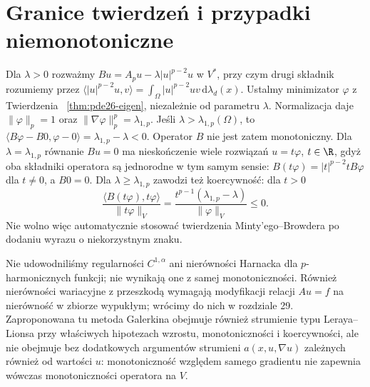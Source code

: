 \section{Granice twierdzeń i przypadki niemonotoniczne}
\begin{kontrprzyklad}
\label{ex:pde26-nonmonotone}
Dla $\lambda>0$ rozważmy
$Bu=A_pu-\lambda|u|^{p-2}u$ w $V^*$,
przy czym drugi składnik rozumiemy przez
$\langle |u|^{p-2}u,v\rangle=
\int_\Omega|u|^{p-2}uv\,\mathrm d\lambda_d(x)$.
Ustalmy minimizator $\varphi$ z Twierdzenia
~\ref{thm:pde26-eigen}, niezależnie od parametru $\lambda$.
Normalizacja daje $\|\varphi\|_p=1$ oraz
$\|\nabla\varphi\|_p^p=\lambda_{1,p}$.
Jeśli $\lambda>\lambda_{1,p}(\Omega)$, to
$\langle B\varphi-B0,\varphi-0\rangle
=\lambda_{1,p}-\lambda<0$.
Operator $B$ nie jest zatem monotoniczny.
Dla $\lambda=\lambda_{1,p}$ równanie $Bu=0$ ma
nieskończenie wiele rozwiązań $u=t\varphi$, $t\in\R$,
gdyż oba składniki operatora są jednorodne
w tym samym sensie: $B(t\varphi)=|t|^{p-2}tB\varphi$
dla $t\ne0$, a $B0=0$.
Dla $\lambda\ge\lambda_{1,p}$ zawodzi też koercywność:
dla $t>0$
\[
 \frac{\langle B(t\varphi),t\varphi\rangle}
      {\|t\varphi\|_V}
 =\frac{t^{p-1}(\lambda_{1,p}-\lambda)}{\|\varphi\|_V}
 \le0.
\]
Nie wolno więc automatycznie stosować twierdzenia
Minty'ego--Browdera po dodaniu wyrazu o niekorzystnym znaku.
\end{kontrprzyklad}

\begin{uwaga}
Nie udowodniliśmy regularności $C^{1,\alpha}$
ani nierówności Harnacka dla $p$-harmonicznych funkcji;
nie wynikają one z samej monotoniczności. Również
nierówności wariacyjne z przeszkodą wymagają
modyfikacji relacji $Au=f$ na nierówność w zbiorze wypukłym;
wrócimy do nich w rozdziale 29.
Zaproponowana tu metoda Galerkina obejmuje również
strumienie typu Leraya--Lionsa przy właściwych
hipotezach wzrostu, monotoniczności i koercywności,
ale nie obejmuje bez dodatkowych argumentów
strumieni $a(x,u,\nabla u)$ zależnych również
od wartości $u$: monotoniczność względem samego
gradientu nie zapewnia wówczas monotoniczności
operatora na $V$.
\end{uwaga}


